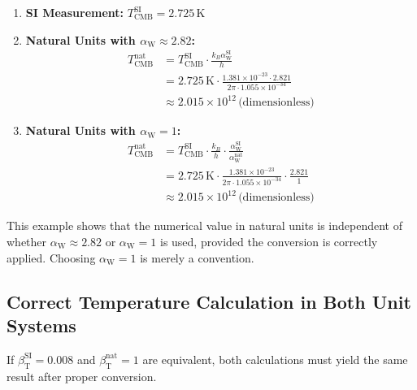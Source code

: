 \documentclass[12pt,a4paper]{article}
\newcommand{\betaT}{\beta_{\text{T}}}
\newcommand{\alphaW}{\alpha_{\text{W}}}
\begin{document}
	\begin{enumerate}
		\item \textbf{SI Measurement:} \(T_{\text{CMB}}^{\text{SI}} = 2.725 \, \text{K}\)
		\item \textbf{Natural Units with \(\alphaW \approx 2.82\):}
		\begin{align}
			T_{\text{CMB}}^{\text{nat}} &= T_{\text{CMB}}^{\text{SI}} \cdot \frac{k_B \alphaW^{\text{SI}}}{h} \\
			&= 2.725 \, \text{K} \cdot \frac{1.381 \times 10^{-23} \cdot 2.821}{2\pi \cdot 1.055 \times 10^{-34}} \\
			&\approx 2.015 \times 10^{12} \, \text{(dimensionless)}
		\end{align}
		\item \textbf{Natural Units with \(\alphaW = 1\):}
		\begin{align}
			T_{\text{CMB}}^{\text{nat}} &= T_{\text{CMB}}^{\text{SI}} \cdot \frac{k_B}{h} \cdot \frac{\alphaW^{\text{SI}}}{\alphaW^{\text{nat}}} \\
			&= 2.725 \, \text{K} \cdot \frac{1.381 \times 10^{-23}}{2\pi \cdot 1.055 \times 10^{-34}} \cdot \frac{2.821}{1} \\
			&\approx 2.015 \times 10^{12} \, \text{(dimensionless)}
		\end{align}
	\end{enumerate}
	
	This example shows that the numerical value in natural units is independent of whether \(\alphaW \approx 2.82\) or \(\alphaW = 1\) is used, provided the conversion is correctly applied. Choosing \(\alphaW = 1\) is merely a convention.
	
	\subsection{Correct Temperature Calculation in Both Unit Systems}
	
	If \(\betaT^{\text{SI}} = 0.008\) and \(\betaT^{\text{nat}} = 1\) are equivalent, both calculations must yield the same result after proper conversion.
	
\end{document}
